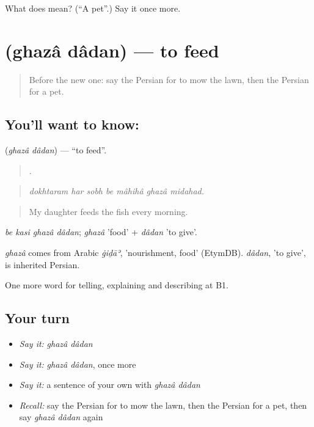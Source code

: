 \begin{tcolorbox}[breakable,colback=teal!4,colframe=teal!35!black,title={Before you move on}]
What does   mean? (\textquotedblleft{}A pet\textquotedblright{}.) Say it once more.
\end{tcolorbox}
\section[\texorpdfstring{\fa{غذا} \fa{دادن} (ghazâ dâdan)}{غذا دادن (ghazâ dâdan)}]{  (ghazâ dâdan) — to feed}

\label{lesson:FA-C539-ghaza-dadan}



\begin{quote}
Before the new one: say the Persian for to mow the lawn, then the Persian for a pet.
\end{quote}

\subsection*{You'll want to know:  }
\textbf{ } (\emph{ghazâ dâdan}) — \textquotedblleft{}to feed\textquotedblright{}.

\begin{quote}
      .
\end{quote}

\begin{quote}
\emph{dokhtaram har sobh be mâhihâ ghazâ midahad.}
\end{quote}

\begin{quote}
My daughter feeds the fish every morning.
\end{quote}

\emph{be kasi ghazâ dâdan}; \emph{ghazâ} 'food' + \emph{dâdan} 'to give'.

\begin{cousinweb}
\emph{ghazâ} comes from Arabic \emph{ġiḏāʾ}, 'nourishment, food' (EtymDB). \emph{dâdan}, 'to give', is inherited Persian.
\end{cousinweb}

\begin{grammarlens}[title={What you've built}]
One more word for telling, explaining and describing at B1.
\end{grammarlens}

\subsection*{Your turn}
\begin{itemize}
\raggedright
  \item \emph{Say it:} \emph{ghazâ dâdan}
  \item \emph{Say it:} \emph{ghazâ dâdan}, once more
  \item \emph{Say it:} a sentence of your own with \emph{ghazâ dâdan}
  \item \emph{Recall:} say the Persian for to mow the lawn, then the Persian for a pet, then say \emph{ghazâ dâdan} again
\end{itemize}

